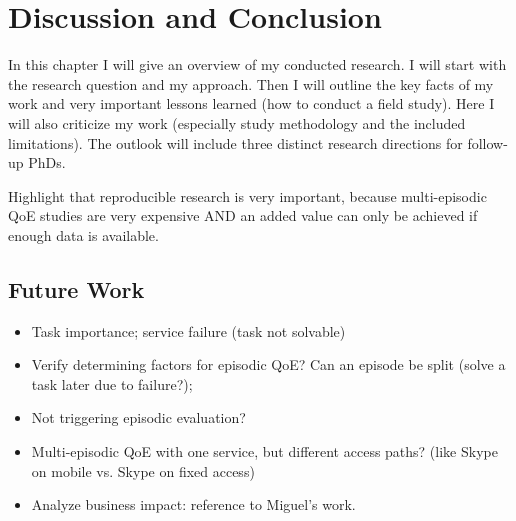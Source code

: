 \chapter{Discussion and Conclusion}\label{chap:09}
\begin{chapter-abstract}
In this chapter I will give an overview of my conducted research.
I will start with the research question and my approach.
Then I will outline the key facts of my work and very important lessons learned (how to conduct a field study).
Here I will also criticize my work (especially study methodology and the included limitations).
The outlook will include three distinct research directions for follow-up PhDs.

Highlight that reproducible research is very important, because multi-episodic QoE studies are very expensive AND an added value can only be achieved if enough data is available.
\end{chapter-abstract}

\section{Future Work}
\begin{itemize}
\item Task importance; service failure (task not solvable)
\item Verify determining factors for episodic QoE? Can an episode be split (solve a task later due to failure?);
\item Not triggering episodic evaluation?
\item Multi-episodic QoE with one service, but different access paths? (like Skype on mobile vs. Skype on fixed access)

\item Analyze business impact: reference to Miguel's work.
\end{itemize}